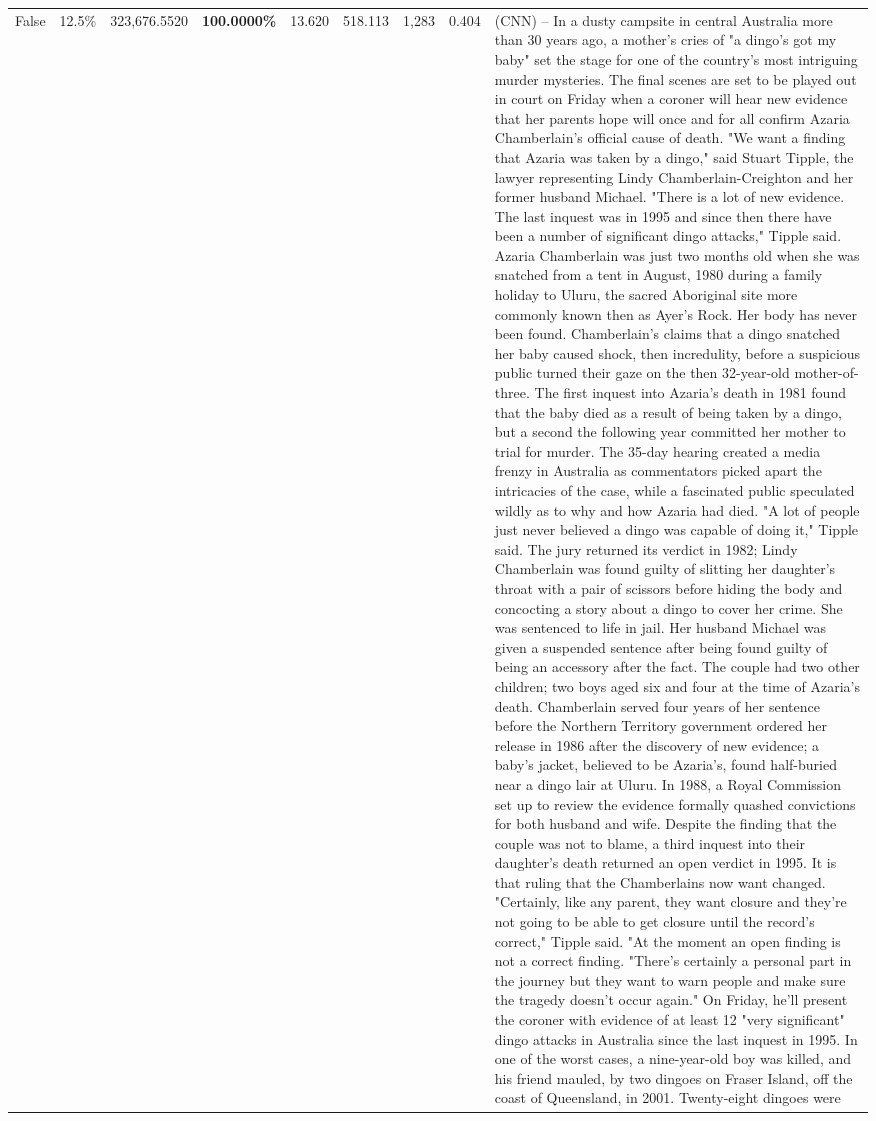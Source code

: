 \begin{table}[H]
\begin{tabular}{lllrlllll}
False & 12.5\% & 323,676.5520 & \bfseries \color{red} 100.0000\% & 13.620 & 518.113 & 1,283 & 0.404 & (CNN) -- In a dusty campsite in central Australia more than 30 years ago, a mother's cries of "a dingo's got my baby" set the stage for one of the country's most intriguing murder mysteries. The final scenes are set to be played out in court on Friday when a coroner will hear new evidence that her parents hope will once and for all confirm Azaria Chamberlain's official cause of death. "We want a finding that Azaria was taken by a dingo," said Stuart Tipple, the lawyer representing Lindy Chamberlain-Creighton and her former husband Michael. "There is a lot of new evidence. The last inquest was in 1995 and since then there have been a number of significant dingo attacks," Tipple said. Azaria Chamberlain was just two months old when she was snatched from a tent in August, 1980 during a family holiday to Uluru, the sacred Aboriginal site more commonly known then as Ayer's Rock. Her body has never been found. Chamberlain's claims that a dingo snatched her baby caused shock, then incredulity, before a suspicious public turned their gaze on the then 32-year-old mother-of-three. The first inquest into Azaria's death in 1981 found that the baby died as a result of being taken by a dingo, but a second the following year committed her mother to trial for murder. The 35-day hearing created a media frenzy in Australia as commentators picked apart the intricacies of the case, while a fascinated public speculated wildly as to why and how Azaria had died. "A lot of people just never believed a dingo was capable of doing it," Tipple said. The jury returned its verdict in 1982; Lindy Chamberlain was found guilty of slitting her daughter's throat with a pair of scissors before hiding the body and concocting a story about a dingo to cover her crime. She was sentenced to life in jail. Her husband Michael was given a suspended sentence after being found guilty of being an accessory after the fact. The couple had two other children; two boys aged six and four at the time of Azaria's death. Chamberlain served four years of her sentence before the Northern Territory government ordered her release in 1986 after the discovery of new evidence; a baby's jacket, believed to be Azaria's, found half-buried near a dingo lair at Uluru. In 1988, a Royal Commission set up to review the evidence formally quashed convictions for both husband and wife. Despite the finding that the couple was not to blame, a third inquest into their daughter's death returned an open verdict in 1995. It is that ruling that the Chamberlains now want changed. "Certainly, like any parent, they want closure and they're not going to be able to get closure until the record's correct," Tipple said. "At the moment an open finding is not a correct finding. "There's certainly a personal part in the journey but they want to warn people and make sure the tragedy doesn't occur again." On Friday, he'll present the coroner with evidence of at least 12 "very significant" dingo attacks in Australia since the last inquest in 1995. In one of the worst cases, a nine-year-old boy was killed, and his friend mauled, by two dingoes on Fraser Island, off the coast of Queensland, in 2001. Twenty-eight dingoes were 
\end{tabular}
\end{table}
